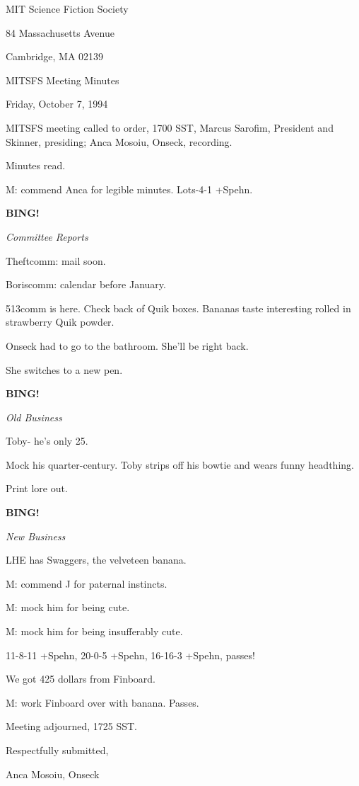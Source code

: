 \documentclass[12pt]{article}
\newcommand{\bing}{{\bf BING!} }
\newcommand{\goto}[1]{\bing \vskip 12pt \centerline{{\em{#1}}}}
\begin{document}
\begin{center}

MIT Science Fiction Society 

84 Massachusetts Avenue

Cambridge, MA 02139

\vspace{12pt}

MITSFS Meeting Minutes 

Friday, October 7, 1994

\end{center}
 
\vspace{18pt}

\setlength{\parskip}{6pt}

\noindent
MITSFS meeting called to order, 1700 SST,
Marcus Sarofim, President and Skinner, presiding; Anca Mosoiu, Onseck, recording.

Minutes read.

M: commend Anca for legible minutes. Lots-4-1 +Spehn.

\goto{Committee Reports}

Theftcomm: mail soon.

Boriscomm: calendar before January.

513comm is here. Check back of Quik boxes. Bananas taste interesting rolled in strawberry Quik powder.

Onseck had to go to the bathroom. She'll be right back.

She switches to a new pen.

\goto{Old Business}

Toby- he's only 25.

Mock his quarter-century. Toby strips off his bowtie and wears funny headthing.

Print lore out.

\goto{New Business}

LHE has Swaggers, the velveteen banana.

M: commend J for paternal instincts.

M: mock him for being cute.

M: mock him for being insufferably cute.

11-8-11 +Spehn, 20-0-5 +Spehn, 16-16-3 +Spehn, passes!

We got 425 dollars from Finboard.

M: work Finboard over with banana. Passes.

\vspace{12pt}

\noindent
Meeting adjourned, 1725 SST.

\vspace{18pt}

\centerline{Respectfully submitted,}
\centerline{Anca Mosoiu, Onseck}
\end{document}
